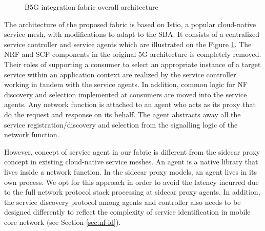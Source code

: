 \documentclass[conference]{IEEEtran}
\begin{document}
\begin{figure}[h!]
\begin{center}
  
  \caption{B5G integration fabric overall architecture  \label{fig1}}
  \end{center}
\end{figure}

The architecture of the proposed fabric is based on Istio\cite{mesh}, a popular
cloud-native service mesh, with modifications to adapt to the SBA. It consists
of a centralized service controller and service agents which are illustrated on
the Figure \ref{fig1}. The NRF and SCP components in the original 5G
architecture is completely removed. Their roles of supporting a consumer to
select an appropriate instance of a target service within an application
context are realized by the service controller working in tandem with the
service agents.  In addition, common logic for NF discovery and selection
implemented at consumers are moved into the service agents. Any network
function is attached to an agent who acts as its proxy that do the request and
response on its behalf.  The agent abstracts away all the service
registration/discovery and selection from the signalling logic of the network
function.

However, concept of service agent in our fabric is different from the sidecar
proxy concept in existing cloud-native service meshes. An agent is a native
library that lives inside a network function. In the sidecar proxy models, an
agent lives in its own process. We opt for this approach in order to avoid the
latency incurred due to the full network protocol stack processing at sidecar
proxy agents. In addition, the service discovery protocol among agents and
controller also needs to be designed differently to reflect the complexity of
service identification in mobile core network (see Section \ref{sec:nf-id}).
\end{document}
